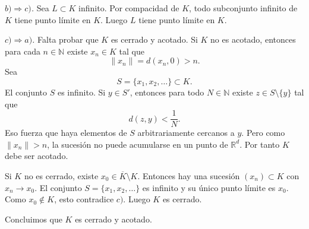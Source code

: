 \documentclass[12pt]{article}
\begin{document}
\textit{$b)\Rightarrow c)$.} Sea $L\subset K$ infinito.
Por compacidad de $K$, todo subconjunto infinito de $K$ tiene punto límite en $K$.
Luego $L$ tiene punto límite en $K$.

\textit{$c)\Rightarrow a)$.} Falta probar que $K$ es cerrado y acotado.
Si $K$ no es acotado, entonces para cada $n\in\mathbb N$ existe $x_n\in K$ tal que
\[
\|x_n\|=d(x_n,0)>n.
\]
Sea
\[
S=\{x_1,x_2,\dots\}\subset K.
\]
El conjunto $S$ es infinito.
Si $y\in S'$, entonces para todo $N\in\mathbb N$ existe $z\in S\setminus\{y\}$ tal que
\[
d(z,y)<\frac1N.
\]
Eso fuerza que haya elementos de $S$ arbitrariamente cercanos a $y$.
Pero como $\|x_n\|>n$, la sucesión no puede acumularse en un punto de $\mathbb R^d$.
Por tanto $K$ debe ser acotado.

Si $K$ no es cerrado, existe $x_0\in \overline K\setminus K$.
Entonces hay una sucesión $(x_n)\subset K$ con $x_n\to x_0$.
El conjunto $S=\{x_1,x_2,\dots\}$ es infinito y su único punto límite es $x_0$.
Como $x_0\notin K$, esto contradice $c)$.
Luego $K$ es cerrado.

Concluimos que $K$ es cerrado y acotado.
\end{document}
